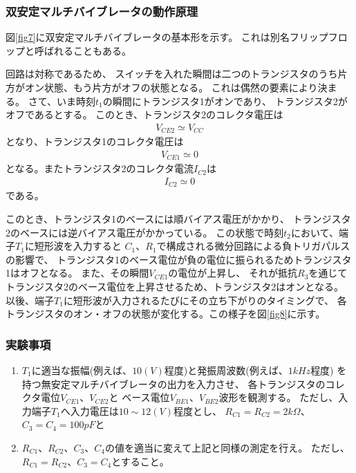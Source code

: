 \documentclass[12pt]{jarticle}
\begin{document}
\subsubsection*{双安定マルチバイブレータの動作原理}
図\ref{fig7}に双安定マルチバイブレータの基本形を示す。
これは別名フリップフロップと呼ばれることもある。

回路は対称であるため、
スイッチを入れた瞬間は二つのトランジスタのうち片方がオン状態、もう片方がオフの状態となる。
これは偶然の要素により決まる。
さて、いま時刻$t_1$の瞬間にトランジスタ1がオンであり、
トランジスタ2がオフであるとする。
このとき、トランジスタ2のコレクタ電圧は
\begin{eqnarray}
    V_{CE2} \simeq V_{CC}\nonumber
\end{eqnarray}
となり、トランジスタ1のコレクタ電圧は
\begin{eqnarray}
    V_{CE1} \simeq 0\nonumber
\end{eqnarray}
となる。またトランジスタ2のコレクタ電流$I_{C2}$は
\begin{eqnarray}
    I_{C2} \simeq 0\nonumber
\end{eqnarray}
である。

このとき、トランジスタ1のベースには順バイアス電圧がかかり、
トランジスタ2のベースには逆バイアス電圧がかかっている。
この状態で時刻$t_2$において、端子$T_1$に短形波を入力すると
$C_1$、$R_1$で構成される微分回路による負トリガパルスの影響で、
トランジスタ1のベース電位が負の電位に振られるためトランジスタ1はオフとなる。
また、その瞬間$V_{CE1}$の電位が上昇し、
それが抵抗$R_3$を通じてトランジスタ2のベース電位を上昇させるため、トランジスタ2はオンとなる。
以後、端子$T_1$に短形波が入力されるたびにその立ち下がりのタイミングで、
各トランジスタのオン・オフの状態が変化する。この様子を図\ref{fig8}に示す。

\subsubsection*{実験事項}
\begin{enumerate}
    \item $T_1$に適当な振幅(例えば、$10(V)$程度)と発振周波数(例えば、$1kHz$程度)
          を持つ無安定マルチバイブレータの出力を入力させ、
          各トランジスタのコレクタ電位$V_{CE1}$、$V_{CE2}$と
          ベース電位$V_{BE1}$、$V_{BE2}$波形を観測する。
          ただし、入力端子$T_1$へ入力電圧は$10\sim12(V)$程度とし、
          $R_{C1}=R_{C2}=2k\Omega$、$C_3=C_4=100pF$と
    \item $R_{C1}$、$R_{C2}$、$C_3$、$C_4$の値を適当に変えて上記と同様の測定を行え。
          ただし、$R_{C1}=R_{C2}$、$C_3=C_4$とすること。
\end{enumerate}
\end{document}
